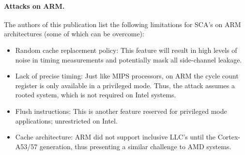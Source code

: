 	\paragraph{Attacks on ARM.} The authors of this publication list the following limitations for SCA's on ARM architectures (some of which can be overcome):
	\begin{itemize}
		\item Random cache replacement policy: This feature will result in high levels of noise in timing measurements and potentially mask all side-channel leakage.
		\item Lack of precise timing: Just like MIPS processors, on ARM the cycle count register is only available in a privileged mode. Thus, the attack assumes a rooted system, which is not required on Intel systems.
		\item Flush instructions: This is another feature reserved for privileged mode applications; unrestricted on Intel.
		\item Cache architecture: ARM did not support inclusive LLC's until the Cortex-A53/57 generation, thus presenting a similar challenge to AMD systems.
	\end{itemize}
